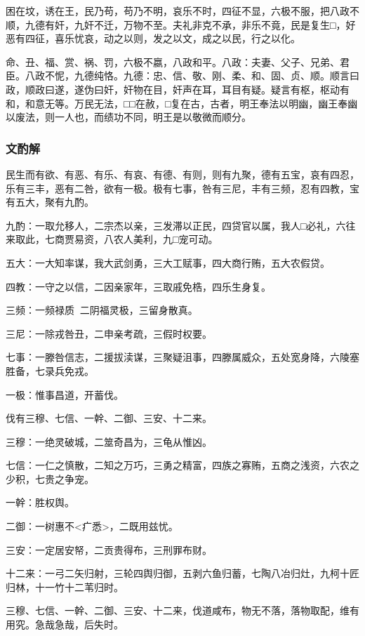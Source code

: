 \documentclass[]{article}
\begin{document}
困在坟，诱在王，民乃苟，苟乃不明，哀乐不时，四征不显，六极不服，把八政不顺，九德有奸，九奸不迁，万物不至。夫礼非克不承，非乐不竟，民是复生□，好恶有四征，喜乐忧哀，动之以则，发之以文，成之以民，行之以化。

命、丑、福、赏、祸、罚，六极不嬴，八政和平。八政：夫妻、父子、兄弟、君臣。八政不怩，九德纯恪。九德：忠、信、敬、刚、柔、和、固、贞、顺。顺言曰政，顺政曰遂，遂伪曰奸，奸物在目，奸声在耳，耳目有疑。疑言有枢，枢动有和，和意无等。万民无法，□□在赦，□复在古，古者，明王奉法以明幽，幽王奉幽以废法，则一人也，而绩功不同，明王是以敬微而顺分。

\hypertarget{header-n30}{%
\subsubsection{文酌解}\label{header-n30}}

民生而有欲、有恶、有乐、有哀、有德、有则，则有九聚，德有五宝，哀有四忍，乐有三丰，恶有二咎，欲有一极。极有七事，咎有三尼，丰有三频，忍有四教，宝有五大，聚有九酌。

九酌：一取允移人，二宗杰以亲，三发滞以正民，四贷官以属，我人□必礼，六往来取此，七商贾易资，八农人美利，九□宠可动。

五大：一大知率谋，我大武剑勇，三大工赋事，四大商行贿，五大农假贷。

四教：一守之以信，二因亲家年，三取戚免梏，四乐生身复。

三频：一频禄质，二阴福灵极，三留身散真。

三尼：一除戎咎丑，二申亲考疏，三假时权要。

七事：一滕咎信志，二援拔渎谋，三聚疑沮事，四滕属威众，五处宽身降，六陵塞胜备，七录兵免戎。

一极：惟事昌道，开蓄伐。

伐有三穆、七信、一幹、二御、三安、十二来。

三穆：一绝灵破城，二筮奇昌为，三龟从惟凶。

七信：一仁之慎散，二知之万巧，三勇之精富，四族之寡贿，五商之浅资，六农之少积，七贵之争宠。

一幹：胜权舆。

二御：一树惠不\textless{}疒悉\textgreater{}，二既用兹忧。

三安：一定居安帑，二贡贵得布，三刑罪布财。

十二来：一弓二矢归射，三轮四舆归御，五剥六鱼归蓄，七陶八冶归灶，九柯十匠归林，十一竹十二苇归时。

三穆、七信、一幹、二御、三安、十二来，伐道咸布，物无不落，落物取配，维有用究。急哉急哉，后失时。
\end{document}
